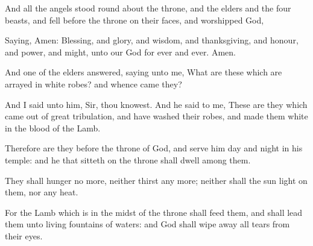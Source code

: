 {And
all the
angels
stood round
about the
throne,
and
{} the
elders
and the
four
beasts,
and
fell
before the
throne
on
their
faces,
and
worshipped
God,

Saying,
Amen:
Blessing,
and
glory,
and
wisdom,
and
thanksgiving,
and
honour,
and
power,
and
might,
{} unto
our
God
for
ever and
ever.
Amen.

And
one
of the
elders
answered,
saying unto
me, What are
these
which
are
arrayed in
white
robes?
and whence
came
they?

And I
said unto
him,
Sir,
thou
knowest.
And he
said to
me,
These
are they which
came
out of
great
tribulation,
and have
washed
their
robes,
and
made
them
white
in the
blood of the
Lamb.

Therefore are
they
before the
throne of
God,
and
serve
him
day
and
night
in
his
temple:
and
he that
sitteth
on the
throne shall
dwell
among
them.

They shall
hunger
no
more,
neither
thirst
any
more;
neither shall the
sun
light
on
them,
nor
any
heat.

For the
Lamb
which is
in the
midst of the
throne shall
feed
them,
and shall
lead
them
unto
living
fountains of
waters:
and
God shall wipe
away
all
tears
from
their
eyes.




\par }
